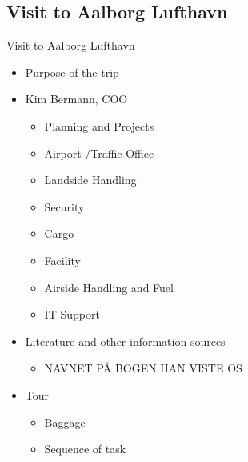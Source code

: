 \subsection{Visit to Aalborg Lufthavn}
\begin{frame}{Visit to Aalborg Lufthavn}{}
	\begin{itemize}
\item Purpose of the trip
\item Kim Bermann, COO
\begin{itemize}
	\item Planning and Projects
	\item Airport-/Traffic Office
	\item Landside Handling
	\item Security
	\item Cargo
	\item Facility
	\item Airside Handling and Fuel
	\item IT Support
\end{itemize}
\item Literature and other information sources
\begin{itemize}
	\item NAVNET PÅ BOGEN HAN VISTE OS
\end{itemize}
\item Tour
\begin{itemize}
	\item Baggage 
	\item Sequence of task
\end{itemize}
\end{itemize}
\end{frame}
